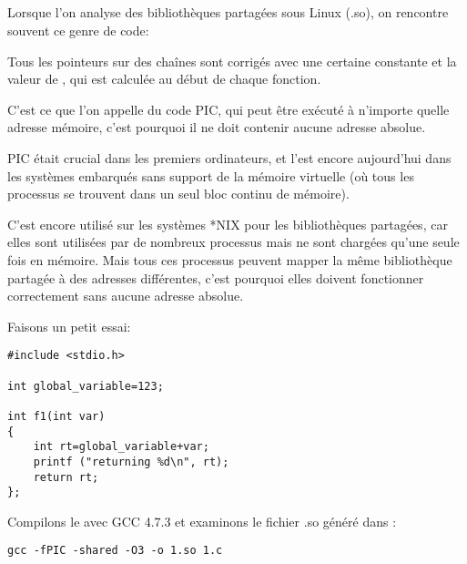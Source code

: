 \subsection{\CapitalPICcode}
\myindex{\PICcode}
\label{sec:PIC}

Lorsque l'on analyse des bibliothèques partagées sous Linux (.so), on rencontre souvent
ce genre de code:



Tous les pointeurs sur des chaînes sont corrigés avec une certaine constante et la valeur de \EBX,
qui est calculée au début de chaque fonction.

C'est ce que l'on appelle du code \ac{PIC}, qui peut être exécuté à n'importe quelle adresse mémoire, c'est pourquoi il ne doit contenir aucune adresse absolue.

\ac{PIC} était crucial dans les premiers ordinateurs, et l'est encore aujourd'hui dans les systèmes embarqués
sans support de la mémoire virtuelle (où tous les processus se trouvent dans un seul bloc continu de mémoire).

C'est encore utilisé sur les systèmes *NIX pour les bibliothèques partagées, car elles
sont utilisées par de nombreux processus mais ne sont chargées qu'une seule fois en mémoire.
Mais tous ces processus peuvent mapper la même bibliothèque partagée à des adresses différentes,
c'est pourquoi elles doivent fonctionner correctement sans aucune adresse absolue.


Faisons un petit essai:

\begin{lstlisting}[style=customc]
#include <stdio.h>

int global_variable=123;

int f1(int var)
{
    int rt=global_variable+var;
    printf ("returning %d\n", rt);
    return rt;
};
\end{lstlisting}

Compilons le avec GCC 4.7.3 et examinons le fichier .so généré dans \IDA:

\begin{lstlisting}
gcc -fPIC -shared -O3 -o 1.so 1.c
\end{lstlisting}



\newcommand{\retstring}{\emph{<<returning \%d\textbackslash{}n>>}}
\newcommand{\globvar}{\emph{global\_variable}}

